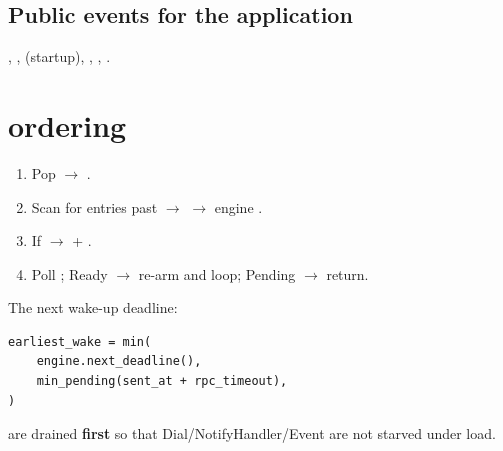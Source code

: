 \subsection{Public events for the application}

, ,  (startup), , , .

\section{ ordering}

\begin{enumerate}[label=\textbf{B\arabic*.}, nosep]
  \item Pop  $\rightarrow$ .
  \item Scan  for entries past  $\rightarrow$  $\rightarrow$ engine .
  \item If  $\rightarrow$  + .
  \item Poll ; Ready $\rightarrow$ re-arm  and loop; Pending $\rightarrow$ return.
\end{enumerate}

The next wake-up deadline:
\begin{lstlisting}
earliest_wake = min(
    engine.next_deadline(),
    min_pending(sent_at + rpc_timeout),
)
\end{lstlisting}

 are drained \textbf{first} so that Dial/NotifyHandler/Event are not starved under load.

